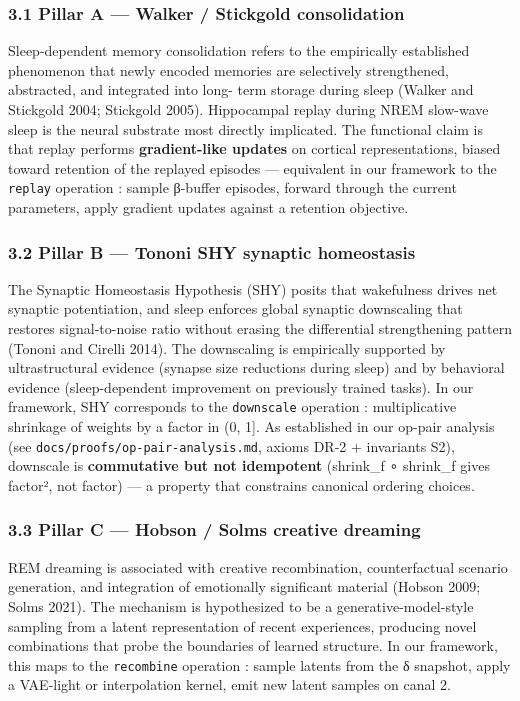 \documentclass[
]{article}
\begin{document}
\subsubsection{3.1 Pillar A --- Walker / Stickgold
consolidation}\label{pillar-a-walker-stickgold-consolidation}

Sleep-dependent memory consolidation refers to the empirically
established phenomenon that newly encoded memories are selectively
strengthened, abstracted, and integrated into long- term storage during
sleep (Walker and Stickgold 2004; Stickgold 2005). Hippocampal replay
during NREM slow-wave sleep is the neural substrate most directly
implicated. The functional claim is that replay performs
\textbf{gradient-like updates} on cortical representations, biased
toward retention of the replayed episodes --- equivalent in our
framework to the \texttt{replay} operation : sample β-buffer episodes,
forward through the current parameters, apply gradient updates against a
retention objective.

\subsubsection{3.2 Pillar B --- Tononi SHY synaptic
homeostasis}\label{pillar-b-tononi-shy-synaptic-homeostasis}

The Synaptic Homeostasis Hypothesis (SHY) posits that wakefulness drives
net synaptic potentiation, and sleep enforces global synaptic
downscaling that restores signal-to-noise ratio without erasing the
differential strengthening pattern (Tononi and Cirelli 2014). The
downscaling is empirically supported by ultrastructural evidence
(synapse size reductions during sleep) and by behavioral evidence
(sleep-dependent improvement on previously trained tasks). In our
framework, SHY corresponds to the \texttt{downscale} operation :
multiplicative shrinkage of weights by a factor in (0, 1{]}. As
established in our op-pair analysis (see
\texttt{docs/proofs/op-pair-analysis.md}, axioms DR-2 + invariants S2),
downscale is \textbf{commutative but not idempotent} (shrink\_f ∘
shrink\_f gives factor², not factor) --- a property that constrains
canonical ordering choices.

\subsubsection{3.3 Pillar C --- Hobson / Solms creative
dreaming}\label{pillar-c-hobson-solms-creative-dreaming}

REM dreaming is associated with creative recombination, counterfactual
scenario generation, and integration of emotionally significant material
(Hobson 2009; Solms 2021). The mechanism is hypothesized to be a
generative-model-style sampling from a latent representation of recent
experiences, producing novel combinations that probe the boundaries of
learned structure. In our framework, this maps to the \texttt{recombine}
operation : sample latents from the δ snapshot, apply a VAE-light or
interpolation kernel, emit new latent samples on canal 2.
\end{document}
